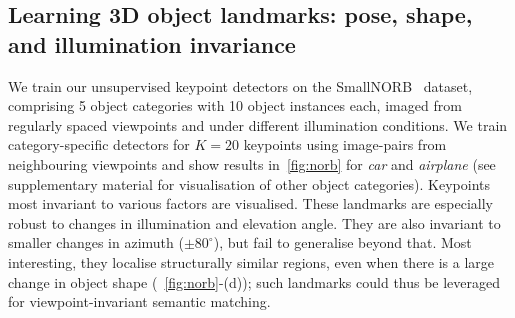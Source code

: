\documentclass{article}
\begin{document}
\subsection{Learning 3D object landmarks: pose, shape, and illumination invariance}\label{s:norb}

We train our unsupervised keypoint detectors on the SmallNORB~\cite{lecunNORB} dataset, comprising 5 object categories with 10 object instances each, imaged from regularly spaced viewpoints and under different illumination conditions. We train category-specific detectors for $K=20$ keypoints using image-pairs from neighbouring viewpoints and show results in~\cref{fig:norb} for \emph{car} and \emph{airplane} (see supplementary material for visualisation of other object categories). Keypoints most invariant to various factors are visualised. These landmarks are especially robust to changes in illumination and elevation angle. They are also invariant to smaller changes in azimuth ($\pm 80^\circ$), but fail to generalise beyond that. Most interesting, they localise structurally similar regions, even when there is a large change in object shape (\eg~\cref{fig:norb}-(d)); such landmarks could thus be leveraged for viewpoint-invariant semantic matching.
\end{document}
